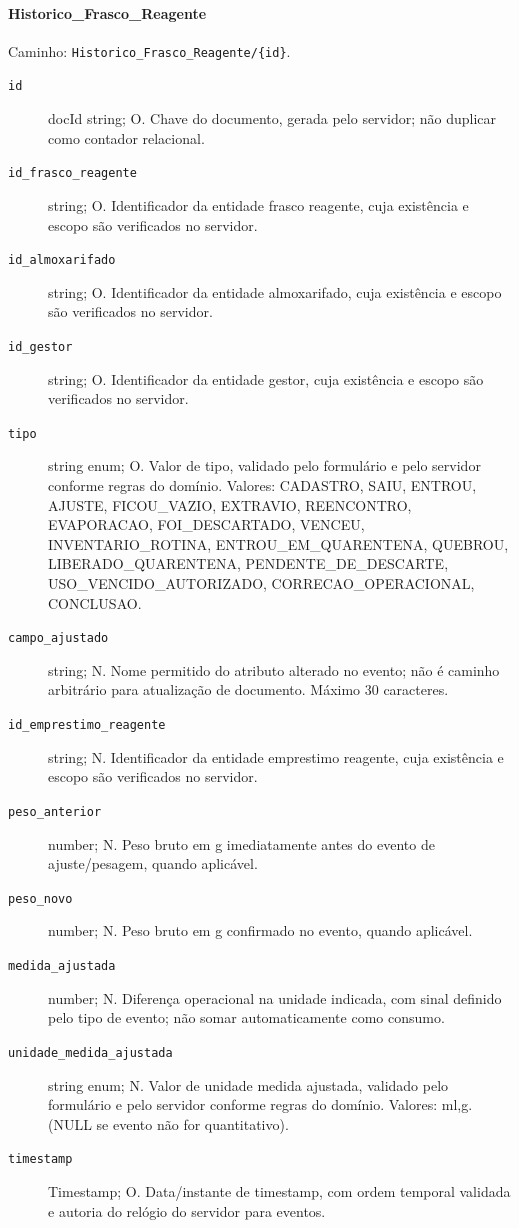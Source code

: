 \paragraph{Historico\_Frasco\_Reagente}\mbox{}\par
Caminho: \texttt{Historico\_Frasco\_Reagente/\{id\}}.
\begin{description}
\item[\texttt{id}] docId string; O. Chave do documento, gerada pelo servidor; não duplicar como contador relacional.
\item[\texttt{id\_frasco\_reagente}] string; O. Identificador da entidade frasco reagente, cuja existência e escopo são verificados no servidor.
\item[\texttt{id\_almoxarifado}] string; O. Identificador da entidade almoxarifado, cuja existência e escopo são verificados no servidor.
\item[\texttt{id\_gestor}] string; O. Identificador da entidade gestor, cuja existência e escopo são verificados no servidor.
\item[\texttt{tipo}] string enum; O. Valor de tipo, validado pelo formulário e pelo servidor conforme regras do domínio. Valores: CADASTRO, SAIU, ENTROU, AJUSTE, FICOU\_VAZIO, EXTRAVIO, REENCONTRO, EVAPORACAO, FOI\_DESCARTADO, VENCEU, INVENTARIO\_ROTINA, ENTROU\_EM\_QUARENTENA, QUEBROU, LIBERADO\_QUARENTENA, PENDENTE\_DE\_DESCARTE, USO\_VENCIDO\_AUTORIZADO, CORRECAO\_OPERACIONAL, CONCLUSAO.
\item[\texttt{campo\_ajustado}] string; N. Nome permitido do atributo alterado no evento; não é caminho arbitrário para atualização de documento. Máximo 30 caracteres.
\item[\texttt{id\_emprestimo\_reagente}] string; N. Identificador da entidade emprestimo reagente, cuja existência e escopo são verificados no servidor.
\item[\texttt{peso\_anterior}] number; N. Peso bruto em g imediatamente antes do evento de ajuste/pesagem, quando aplicável.
\item[\texttt{peso\_novo}] number; N. Peso bruto em g confirmado no evento, quando aplicável.
\item[\texttt{medida\_ajustada}] number; N. Diferença operacional na unidade indicada, com sinal definido pelo tipo de evento; não somar automaticamente como consumo.
\item[\texttt{unidade\_medida\_ajustada}] string enum; N. Valor de unidade medida ajustada, validado pelo formulário e pelo servidor conforme regras do domínio. Valores: ml,g. (NULL se evento não for quantitativo).
\item[\texttt{timestamp}] Timestamp; O. Data/instante de timestamp, com ordem temporal validada e autoria do relógio do servidor para eventos.
\end{description}

